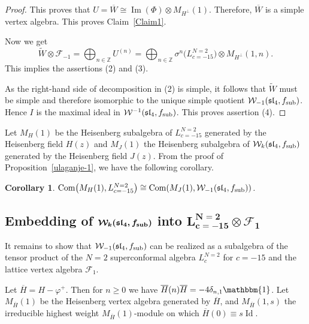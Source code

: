 \documentclass[pdftex]{sigma}
\numberwithin{equation}{section}
\newcommand{\F}{\mathcal F}
\newtheorem{Corollary}[Theorem]{Corollary}
\begin{document}
\begin{proof}
This proves that $ U= \overline W \cong \operatorname{Im} (\Phi) \otimes M_{H^{\perp}} (1) $. Therefore, $\overline W$ is a simple vertex algebra. This proves Claim~\ref{Claim1}.

Now we get
\[
 \widetilde W \otimes \F_{-1} = \bigoplus_{n \in \mathbb{Z}} U^{(n)} = \bigoplus_{n \in \mathbb{Z}} \sigma^n \bigl(L^{N=2}_{c=-15}\bigr) \otimes M_{H^\perp} (1, n).
 \]
This implies the assertions (2) and (3).

As the right-hand side of decomposition in (2) is simple, it follows that $\widetilde W $ must be simple and therefore isomorphic to the unique simple quotient $\mathcal{W}_{-1}(\mathfrak{sl}_4, f_{\rm sub})$. Hence $I$ is the maximal ideal in $\mathcal{W}^{-1}(\mathfrak{sl}_4, f_{\rm sub})$.
This proves assertion (4).
\end{proof}

 Let $M_H(1)$ be the Heisenberg subalgebra of $L^{N=2}_{c=-15}$ generated by the Heisenberg field $H(z)$ and $M_J(1)$ the Heisenberg subalgebra of $\mathcal{W}_{k}(\mathfrak{sl}_4, f_{\rm sub}) $ generated by the Heisenberg field $J(z)$.
From the proof of Proposition~\ref{ulaganje-1}, we have the following corollary.

	\begin{Corollary} \label{pf} $\operatorname{Com} \bigl(M_H(1) , L^{N=2}_{c=-15} \bigr) \cong \operatorname{Com} (M_J(1), \mathcal{W}_{-1}(\mathfrak{sl}_4, f_{\rm sub}) )$. \end{Corollary}
	
\subsection[Embedding of W\_k(sl\_4, f\_sub) into L\^{}N=2\_c=-15]{Embedding of $\boldsymbol{\mathcal{W}_{k}(\mathfrak{sl}_4, f_{\rm sub})}$ into $\boldsymbol{L^{N=2}_{c=-15} \otimes \F_{1}}$ }

It remains to show that $\mathcal{W}_{-1}(\mathfrak{sl}_4, f_{\rm sub}) $ can be realized as a subalgebra of the tensor product of the $N=2$ superconformal algebra $L^{N=2}_{c}$ for $c=-15$ and the lattice vertex algebra $\F_1$.

Let $\overline{H} = H - \varphi^+$. Then for $n \ge 0$ we have $\overline H(n) \overline H = -4 \delta_{n,1}\mathbbm{1}$.
Let $M_{\overline{H}} (1)$ be the Heisenberg vertex algebra generated by $\overline H$, and $M_{\overline{H}} (1, s)$ the irreducible highest weight $M_{\overline{H}} (1)$-module on which
$\overline H(0) \equiv s \operatorname{Id}$.
\end{document}
